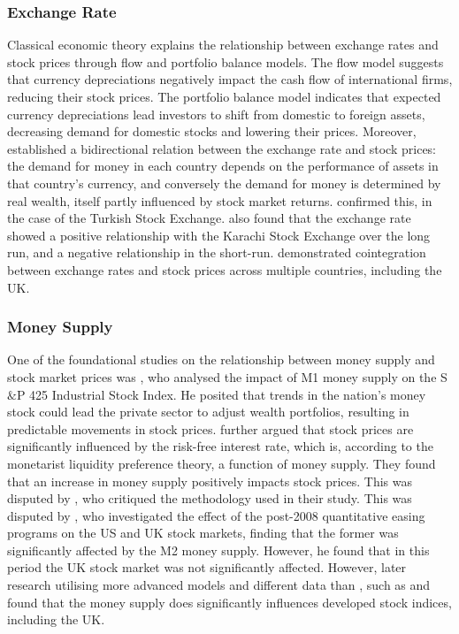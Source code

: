 \documentclass[11pt,a4paper]{article}
\newcommand{\citeboth}[1]{\citeauthor{#1} \citep{#1}}
\begin{document}
\subsubsection{Exchange Rate}

Classical economic theory explains the relationship between exchange rates and stock prices through flow and portfolio balance models. The flow model suggests that currency depreciations negatively impact the cash flow of international firms, reducing their stock prices. The portfolio balance model indicates that expected currency depreciations lead investors to shift from domestic to foreign assets, decreasing demand for domestic stocks and lowering their prices. 
Moreover, \citeboth{branson1977} established a bidirectional relation between the exchange rate and stock prices: the demand for money in each country depends on the performance of assets in that country’s currency, and conversely the demand for money is determined by real wealth, itself partly influenced by stock market returns. 
\citeboth{aydemir2009} confirmed this, in the case of the Turkish Stock Exchange. 
\citeboth{khan2018} also found that the exchange rate showed a positive relationship with the Karachi Stock Exchange over the long run, and a negative relationship in the short-run. 
\citeboth{wong2022} demonstrated cointegration between exchange rates and stock prices across multiple countries, including the UK.

\subsubsection{Money Supply}

One of the foundational studies on the relationship between money supply and 
stock market prices was \citeboth{palmer1970}, who analysed the impact of M1 money supply on the S$\&$P 425 Industrial Stock Index. 
He posited that trends in the nation's money stock could lead the 
private sector to adjust wealth portfolios, resulting in 
predictable movements in stock prices. \citeboth{homa1971} further argued that 
stock prices are significantly influenced by the risk-free interest rate, 
which is, according to the monetarist liquidity preference theory, a 
function of money supply. They found that an increase in money supply 
positively impacts stock prices. This was disputed by \citeboth{pesando1974}, 
who critiqued the methodology used in their study. This was disputed by \citeboth{pícha2017},
who investigated the effect of the post-2008 quantitative easing programs on the US and UK stock markets, finding 
that the former was significantly affected by the M2 money supply. However, he found that in this period 
the UK stock market was not significantly affected.
However, later research utilising more advanced models and different data than \citeboth{palmer1970}, such as \citeboth{bahloul2017} and 
\citeboth{synek2024} found that the money supply does significantly influences developed stock indices, including the UK. 
\end{document}
